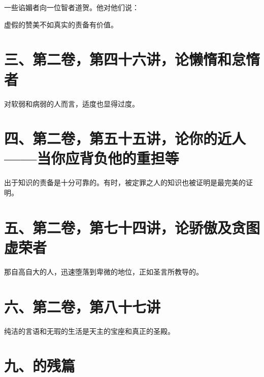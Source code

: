 一些谄媚者向一位智者道贺。他对他们说：\par

虚假的赞美不如真实的责备有价值。\par


\section{三、第二卷，第四十六讲，论懒惰和怠惰者}

对软弱和病弱的人而言，适度也显得过度。\par


\section{四、第二卷，第五十五讲，论你的近人——当你应背负他的重担等}

出于知识的责备是十分可靠的。有时，被定罪之人的知识也被证明是最完美的证明。\par


\section{五、第二卷，第七十四讲，论骄傲及贪图虚荣者}

那自高自大的人，迅速堕落到卑微的地位，正如圣言所教导的。\par


\section{六、第二卷，第八十七讲}

纯洁的言语和无瑕的生活是天主的宝座和真正的圣殿。\par


\section{九、的残篇}

